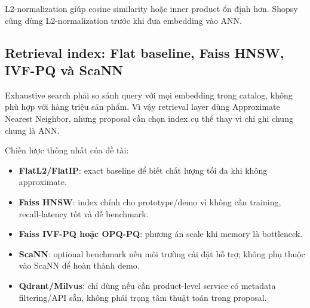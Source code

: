 \documentclass[12pt,a4paper]{article}
\begin{document}
L2-normalization giúp cosine similarity hoặc inner product ổn định hơn. Shopsy cũng dùng L2-normalization trước khi đưa embedding vào ANN.

\subsection{Retrieval index: Flat baseline, Faiss HNSW, IVF-PQ và ScaNN}
Exhaustive search phải so sánh query với mọi embedding trong catalog, không phù hợp với hàng triệu sản phẩm. Vì vậy retrieval layer dùng Approximate Nearest Neighbor, nhưng proposal cần chọn index cụ thể thay vì chỉ ghi chung chung là ANN.

Chiến lược thống nhất của đề tài:
\begin{itemize}
  \item \textbf{FlatL2/FlatIP}: exact baseline để biết chất lượng tối đa khi không approximate.
  \item \textbf{Faiss HNSW}: index chính cho prototype/demo vì không cần training, recall-latency tốt và dễ benchmark.
  \item \textbf{Faiss IVF-PQ hoặc OPQ-PQ}: phương án scale khi memory là bottleneck.
  \item \textbf{ScaNN}: optional benchmark nếu môi trường cài đặt hỗ trợ; không phụ thuộc vào ScaNN để hoàn thành demo.
  \item \textbf{Qdrant/Milvus}: chỉ dùng nếu cần product-level service có metadata filtering/API sẵn, không phải trọng tâm thuật toán trong proposal.
\end{itemize}
\end{document}
